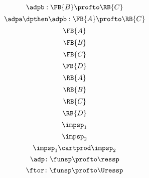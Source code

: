 {\begin{forslides}
\begin{equation}
        \end{equation}
        \begin{equation}
            \label{eq:adp2}
            \adpb: \FB{B} \profto  \RB{C}
        \end{equation}
        \begin{equation}
            \label{eq:adp1adp2}
            \adpa\dpthen\adpb: \FB{A} \profto  \RB{C}
        \end{equation}
        \begin{equation}
            \label{eq:FA}
            \FB{A}
        \end{equation}
        \begin{equation}
            \label{eq:FB}
            \FB{B}
        \end{equation}
        \begin{equation}
            \label{eq:FC}
            \FB{C}
        \end{equation}
        \begin{equation}
            \label{eq:FD}
            \FB{D}
        \end{equation}
        \begin{equation}
            \label{eq:RA}
            \RB{A}
        \end{equation}
        \begin{equation}
            \label{eq:RB}
            \RB{B}
        \end{equation}
        \begin{equation}
            \label{eq:RC}
            \RB{C}
        \end{equation}
        \begin{equation}
            \label{eq:RD}
            \RB{D}
        \end{equation}
        \begin{equation}
            \label{eq:impsp1}
            \impsp_1
        \end{equation}
        \begin{equation}
            \label{eq:impsp2}
            \impsp_2
        \end{equation}
        \begin{equation}
            \label{eq:impsp12}
            \impsp_{1} \cartprod \impsp_{2}
        \end{equation}
        \begin{equation}
            \label{eq:dproba}
            \adp \colon \funsp \profto \ressp
        \end{equation}
        \begin{equation}
            \label{eq:dprob2}
            \ftor \colon \funsp \profto \Uressp
        \end{equation}
    \end{forslides}
}

